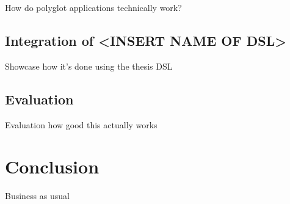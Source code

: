 \documentclass[12pt]{article}
\begin{document}
How do polyglot applications technically work?

\subsection{Integration of <INSERT NAME OF DSL>}
\label{sec:orgf3edc1c}

Showcase how it's done using the thesis DSL

\subsection{Evaluation}
\label{sec:orga0848b5}

Evaluation how good this actually works

\section{Conclusion}
\label{sec:org267c794}

Business as usual
\end{document}

